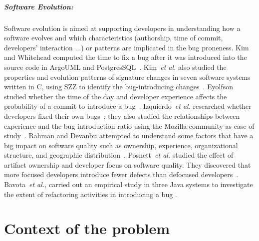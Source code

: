 \documentclass[a4paper, 12pt]{book}
\begin{document}
\paragraph{Software Evolution:} Software evolution is aimed at supporting developers in understanding how a software evolves and which characteristics (authorship, time of commit, developers' interaction ...) or patterns are implicated in the bug proneness.
Kim and Whitehead computed the time to fix a bug after it was introduced into the source code in ArgoUML and PostgresSQL~\cite{kim2006long}. Kim~\textit{et al.} also studied the properties and evolution patterns of signature changes in seven software systems written in C, using SZZ to identify the bug-introducing changes~\cite{kim2006properties}. Eyolfson studied whether the time of the day and developer experience affects the probability of a commit to introduce a bug~\cite{kamei2010revisiting}. Izquierdo~\textit{et al.} researched whether developers fixed their own bugs~\cite{izquierdo2011developers}; they also studied the relationships between experience and the bug introduction ratio using the Mozilla community as case of study~\cite{izquierdo2012more}. Rahman and Devanbu attempted to understand some factors that have a big impact on software quality such as ownership, experience, organizational structure, and geographic distribution~\cite{rahman2011ownership}. Posnett~\textit{et al.} studied the effect of artifact ownership and developer focus on software quality. They discovered that more focused developers introduce fewer defects than defocused developers~\cite{posnett2013dual}.  Bavota~\textit{et al.,} carried out an empirical study in three Java systems to investigate the extent of refactoring activities in introducing a bug \cite{bavota2012does}. 




\cleardoublepage
\chapter{Context of the problem}
\label{chap:context}
\end{document}
